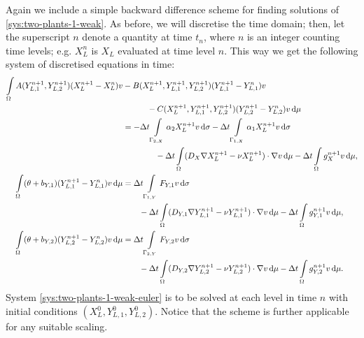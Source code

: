\documentclass[11pt]{article}
\begin{document}
Again we include a simple backward difference scheme for finding solutions of \eqref{sys:two-plants-1-weak}. As before, we will discretise the time domain; then, let the superscript $n$ denote a quantity at time $t_n$, where $n$ is an integer counting time levels; e.g. $X_L^n$ is $X_L$ evaluated at time level $n$. This way we get the following system of discretised equations in time:
\begin{subequations}
\label{sys:two-plants-1-weak-euler}
\begin{align}
    \int\limits_\Omega
    A(Y_{L,1}^{n+1}, Y_{L,2}^{n+1}) (X_L^{n+1} - X_L^n) v &- B(X_L^{n+1}, Y_{L,1}^{n+1}, Y_{L,2}^{n+1}) (Y_{L,1}^{n+1} - Y_{L,1}^n) v 
    \notag
    \\
    &\qquad\quad - C(X_L^{n+1}, Y_{L,1}^{n+1}, Y_{L,2}^{n+1}) (Y_{L,2}^{n+1} - Y_{L,2}^n) v \dif \mu 
    \notag
    \\
    &= -\Delta t
    \int\limits_{\Gamma_{2,X}}  \alpha_2 X_L^{n+1} v \dif \sigma
    - \Delta t \int\limits_{\Gamma_{1,X}} \alpha_1 X_L^{n+1} v \dif \sigma
    \\
    &\qquad\qquad - \Delta t \int\limits_\Omega
    (D_X \nabla X_L^{n+1} - \nu X_L^{n+1}) \cdot \nabla v  \dif \mu
    - \Delta t \int\limits_\Omega g_X^{n+1} v \dif \mu,
    \notag
    \\
    \int\limits_\Omega (\theta + b_{Y,1}) (Y_{L,1}^{n+1} - Y_{L,1}^n) v \dif \mu  &=
    \Delta t \int\limits_{\Gamma_{1,Y}} F_{Y,1} v \dif\sigma
    \notag \\ & \qquad
    - \Delta t \int\limits_\Omega (D_{Y,1} \nabla Y_{L,1}^{n+1} - \nu Y_{L,1}^{n+1}) \cdot \nabla v \dif\mu -  \Delta t \int\limits_\Omega g_{Y,1}^{n+1} v \dif\mu,
    \\
    \int\limits_\Omega (\theta + b_{Y,2}) (Y_{L,2}^{n+1} - Y_{L,2}^n) v \dif\mu  &= \Delta t \int\limits_{\Gamma_{2,Y}} F_{Y,2} v \dif\sigma 
    \notag \\ & \qquad
    - \Delta t 
    \int\limits_\Omega (D_{Y,2} \nabla Y_{L,2}^{n+1} - \nu Y_{L,2}^{n+1}) \cdot \nabla v \dif\mu - \Delta t \int\limits_\Omega g_{Y,2}^{n+1} v \dif\mu.
\end{align}
\end{subequations}
System \eqref{sys:two-plants-1-weak-euler} is to be solved at each level in time \( n\) with initial conditions \( (X_L^0,Y_{L,1}^0, Y_{L,2}^0)\). Notice that the scheme is further applicable for any suitable scaling.
\end{document}
